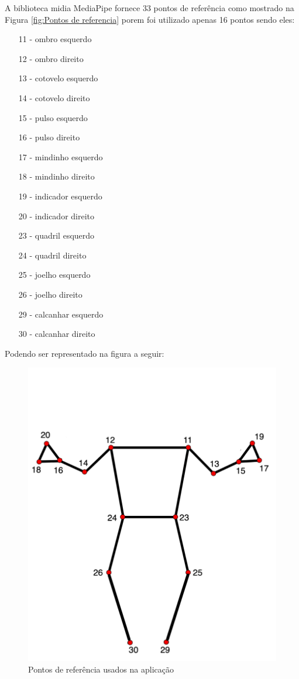 A biblioteca midia MediaPipe fornece 33 pontos de referência como mostrado na Figura \ref{fig:Pontos de referencia} porem foi utilizado apenas 16 pontos sendo eles:

\begin{itemize}
    \item[11] - ombro esquerdo
    \item[12] - ombro direito
    \item[13] - cotovelo esquerdo
    \item[14] - cotovelo direito
    \item[15] - pulso esquerdo
    \item[16] - pulso direito
    \item[17] - mindinho esquerdo
    \item[18] - mindinho direito
    \item[19] - indicador esquerdo
    \item[20] - indicador direito
    \item[23] - quadril esquerdo
    \item[24] - quadril direito
    \item[25] - joelho esquerdo
    \item[26] - joelho direito
    \item[29] - calcanhar esquerdo
    \item[30] - calcanhar direito
\end{itemize}

Podendo ser representado na figura a seguir:

\begin{figure}[!htb]
	\centering
	\includegraphics[scale=0.24]{figuras/eph/pose_landmarks_custom.png}
	\caption{Pontos de referência usados na aplicação}
	\label{fig:Pontos de referencia usados na aplicacao}
\end{figure}
\newpage

